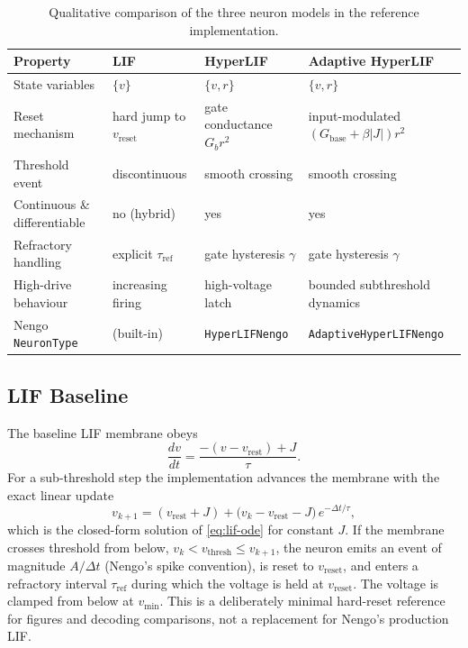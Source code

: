 \documentclass[journal]{IEEEtran}
\newcommand{\vth}{v_{\mathrm{thresh}}}
\newcommand{\vr}{v_{\mathrm{rest}}}
\newcommand{\vre}{v_{\mathrm{reset}}}
\newcommand{\vmin}{v_{\min}}
\newcommand{\Gb}{G_{b}}
\newcommand{\Gbase}{G_{\mathrm{base}}}
\newcommand{\code}[1]{\texttt{#1}}
\begin{document}
\begin{table}[t]
\centering
\caption{Qualitative comparison of the three neuron models in the reference implementation.}
\label{tab:modelcompare}
\begin{tabular}{@{}p{}p{}p{}p{}@{}}
\toprule
Property & LIF & HyperLIF & Adaptive HyperLIF \\
\midrule
State variables & $\{v\}$ & $\{v,r\}$ & $\{v,r\}$ \\
Reset mechanism & hard jump to $\vre$ & gate conductance $\Gb r^2$ & input-modulated $(\Gbase+\beta|J|)r^2$ \\
Threshold event & discontinuous & smooth crossing & smooth crossing \\
Continuous \& differentiable & no (hybrid) & yes & yes \\
Refractory handling & explicit $\tau_{\mathrm{ref}}$ & gate hysteresis $\gamma$ & gate hysteresis $\gamma$ \\
High-drive behaviour & increasing firing & high-voltage latch & bounded subthreshold dynamics \\
Nengo \code{NeuronType} & (built-in) & \code{HyperLIFNengo} & \code{AdaptiveHyperLIFNengo} \\
\bottomrule
\end{tabular}
\end{table}

\subsection{LIF Baseline}\label{sec:lif}
The baseline LIF membrane obeys
\begin{equation}
  \frac{dv}{dt} = \frac{-(v-\vr) + J}{\tau}. \label{eq:lif-ode}
\end{equation}
For a sub-threshold step the implementation advances the membrane with the exact
linear update
\begin{equation}
  v_{k+1} = (\vr + J) + \big(v_k - \vr - J\big)\,e^{-\Delta t/\tau},
  \label{eq:lif-update}
\end{equation}
which is the closed-form solution of \cref{eq:lif-ode} for constant $J$. If the
membrane crosses threshold from below, $v_k<\vth\le v_{k+1}$, the neuron emits an
event of magnitude $A/\Delta t$ (Nengo's spike convention), is reset to $\vre$,
and enters a refractory interval $\tau_{\mathrm{ref}}$ during which the voltage
is held at $\vre$. The voltage is clamped from below at $\vmin$. This is a
deliberately minimal hard-reset reference for figures and decoding comparisons,
not a replacement for Nengo's production LIF.
\end{document}
